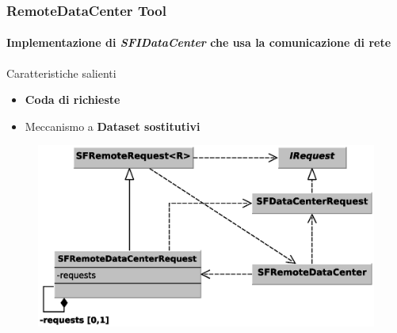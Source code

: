 \documentclass[ignorenonframetext,8pt]{beamer}
\begin{document}
	\begin{frame}
		\frametitle{RemoteDataCenter Tool}
		\framesubtitle{Implementazione di \textit{SFIDataCenter} che usa la comunicazione di rete}
		\begin{block}{Caratteristiche salienti}
			\begin{itemize}
				\item \textbf{Coda di richieste}
				\item Meccanismo a \textbf{Dataset sostitutivi}
			\end{itemize}
			\begin{figure}
				\includegraphics[width=.60\textwidth]{Immagini/RemoteDataCenter}
			\end{figure}
		\end{block}
	\end{frame}
\end{document}
